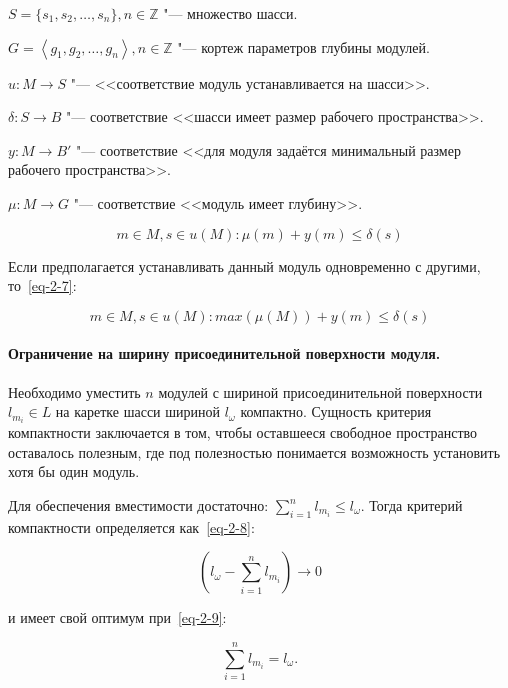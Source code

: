 \noindent $S = \{s_1, s_2, \ldots, s_n\}, n \in \mathbb{Z} $ "--- множество шасси.

\noindent $G = \left \langle g_1, g_2, \ldots, g_n\right \rangle, n \in \mathbb{Z} $ "--- кортеж параметров глубины модулей.

\noindent $u: M \rightarrow S$ "--- <<соответствие модуль устанавливается на шасси>>.

\noindent $\delta: S \rightarrow B$ "--- соответствие <<шасси имеет размер рабочего пространства>>.

\noindent $y: M \rightarrow B'$ "--- соответствие <<для модуля задаётся минимальный размер рабочего пространства>>.

\noindent $\mu: M \rightarrow G$ "--- соответствие <<модуль имеет глубину>>.
 
\begin{equation}
m \in M, s \in u(M): \mu(m) + y(m) \leq \delta(s)
\label{eq-2-6}
\end{equation}

Если предполагается устанавливать данный модуль одновременно с другими, то~\cref{eq-2-7}:

\begin{equation}
m \in M, s \in u(M): max(\mu(M)) + y(m) \leq \delta(s)
\label{eq-2-7}
\end{equation}

\paragraph{Ограничение на ширину присоединительной поверхности модуля.} Необходимо уместить $n$ модулей с шириной присоединительной поверхности $l_{m_i} \in L$ на каретке шасси шириной $l_\omega$ компактно. Сущность критерия компактности заключается в том, чтобы оставшееся свободное пространство оставалось полезным, где под полезностью понимается возможность установить хотя бы один модуль.

\noindent Для обеспечения вместимости достаточно: $\sum_{i=1}^{n}l_{m_i} \leq l_\omega$.
\noindent Тогда критерий компактности определяется как~\cref{eq-2-8}: 

\begin{equation}
\left ( l_\omega - \sum_{i=1}^{n} l_{m_i} \right )\rightarrow 0
\label{eq-2-8} 
\end{equation}

\noindent и имеет свой оптимум при~\cref{eq-2-9}:

\begin{equation}
\sum_{i=1}^{n} l_{m_i} = l_\omega.
\label{eq-2-9}
\end{equation}

